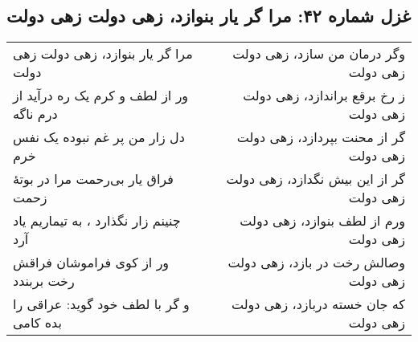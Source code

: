 \begin{center}
\section*{غزل شماره ۴۲: مرا گر یار بنوازد، زهی دولت زهی دولت}
\label{sec:042}
\begin{longtable}{l p{0.5cm} r}
مرا گر یار بنوازد، زهی دولت زهی دولت
&&
وگر درمان من سازد، زهی دولت زهی دولت
\\
ور از لطف و کرم یک ره درآید از درم ناگه
&&
ز رخ برقع براندازد، زهی دولت زهی دولت
\\
دل زار من پر غم نبوده یک نفس خرم
&&
گر از محنت بپردازد، زهی دولت زهی دولت
\\
فراق یار بی‌رحمت مرا در بوتهٔ زحمت
&&
گر از این بیش نگدازد، زهی دولت زهی دولت
\\
چنینم زار نگذارد ، به تیماریم یاد آرد
&&
ورم از لطف بنوازد، زهی دولت زهی دولت
\\
ور از کوی فراموشان فراقش رخت بربندد
&&
وصالش رخت در بازد، زهی دولت زهی دولت
\\
و گر با لطف خود گوید: عراقی را بده کامی
&&
که جان خسته دربازد، زهی دولت زهی دولت
\\
\end{longtable}
\end{center}
